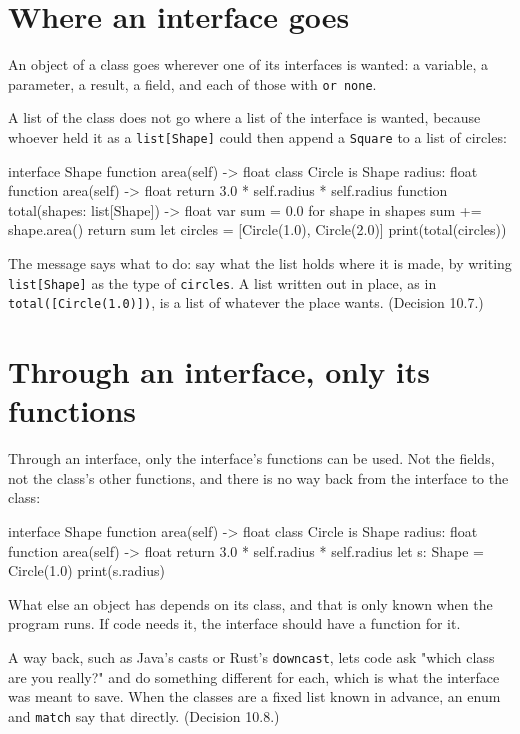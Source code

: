 \section{Where an interface goes}

An object of a class goes wherever one of its interfaces is wanted: a
variable, a parameter, a result, a field, and each of those with
\verb|or none|.

A list of the class does not go where a list of the interface is
wanted, because whoever held it as a \verb|list[Shape]| could then
append a \verb|Square| to a list of circles:

\begin{zeno}[fails=yes]
interface Shape {
    function area(self) -> float
}
class Circle is Shape {
    radius: float
    function area(self) -> float {
        return 3.0 * self.radius * self.radius
    }
}
function total(shapes: list[Shape]) -> float {
    var sum = 0.0
    for shape in shapes {
        sum += shape.area()
    }
    return sum
}
let circles = [Circle(1.0), Circle(2.0)]
print(total(circles))
\end{zeno}

The message says what to do: say what the list holds where it is
made, by writing \verb|list[Shape]| as the type of \verb|circles|. A list written out in
place, as in \verb|total([Circle(1.0)])|, is a list of whatever the
place wants. (Decision 10.7.)

\section{Through an interface, only its functions}

Through an interface, only the interface's functions can be used. Not
the fields, not the class's other functions, and there is no way back
from the interface to the class:

\begin{zeno}[fails=yes]
interface Shape {
    function area(self) -> float
}
class Circle is Shape {
    radius: float
    function area(self) -> float {
        return 3.0 * self.radius * self.radius
    }
}
let s: Shape = Circle(1.0)
print(s.radius)
\end{zeno}

What else an object has depends on its class, and that is only known
when the program runs. If code needs it, the interface should have a
function for it.

\begin{why}
A way back, such as Java's casts or Rust's \verb|downcast|, lets code
ask "which class are you really?" and do something different for
each, which is what the interface was meant to save. When the classes
are a fixed list known in advance, an enum and \verb|match| say that
directly. (Decision 10.8.)
\end{why}

